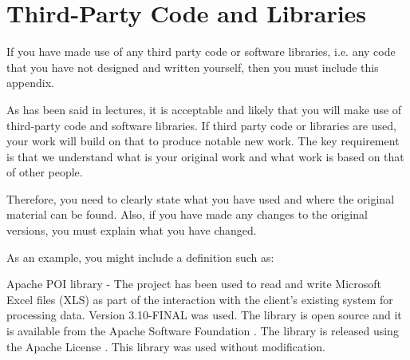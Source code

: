 \chapter{Third-Party Code and Libraries}

If you have made use of any third party code or software libraries, i.e. any code that you have not designed and written yourself, then you must include this appendix. 

As has been said in lectures, it is acceptable and likely that you will make use of third-party code and software libraries. If third party code or libraries are used, your work will build on that to produce notable new work. The key requirement is that we understand what is your original work and what work is based on that of other people. 

Therefore, you need to clearly state what you have used and where the original material can be found. Also, if you have made any changes to the original versions, you must explain what you have changed. 

As an example, you might include a definition such as: 

Apache POI library - The project has been used to read and write Microsoft Excel files (XLS) as part of the interaction with the client's existing system for processing data. Version 3.10-FINAL was used. The library is open source and it is available from the Apache Software Foundation 
\cite{apache_poi}. The library is released using the Apache License 
\cite{apache_license}. This library was used without modification. 